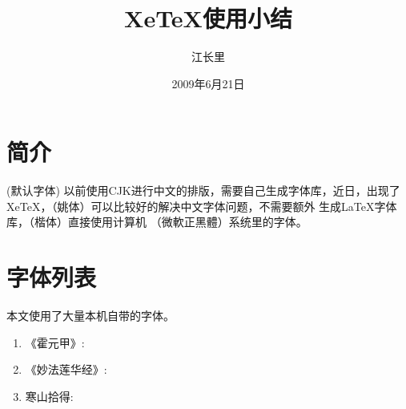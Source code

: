 \documentclass[12pt,a4paper]{article}
\begin{document}
\tableofcontents


\makeatletter
\let\@afterindentfalse\@afterindenttrue
\@afterindenttrue
\makeatother
\setlength{\parindent}{2em}  %


\title{\hei XeTeX使用小结}
\author{\song 江长里}
\date{\kai 2009年6月21日}

\maketitle

\section{简介}
(默认字体) 以前使用CJK进行中文的排版，需要自己生成字体库，近日，出现了XeTeX，\yao （姚体）可以比较好的解决中文字体问题，不需要额外
生成LaTeX字体库，\kai （楷体）直接使用计算机 \henghei （微軟正黑體）系统里的字体。

\section{字体列表}
本文使用了大量本机自带的字体。

\begin{enumerate}
	\item 《霍元甲》:  
	\item   《妙法莲华经》:  
	\item    寒山拾得: 
\end{enumerate}
\end{document}
